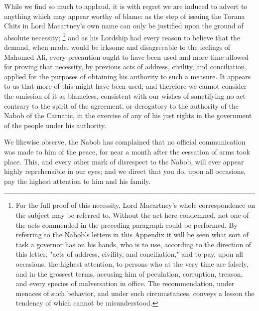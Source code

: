 While we find so much to applaud, it is with regret we are induced to advert to anything which may appear worthy of blame: as the step of issuing the Torana Chits in Lord Macartney's own name can only be justified upon the ground of absolute necessity;
\footnote{ For the full proof of this necessity, Lord Macartney's whole correspondence on the subject may be referred to. Without the act here condemned, not one of the acts commended in the preceding paragraph could be performed. By referring to the Nabob's letters in this Appendix it will be seen what sort of task a governor has on his hands, who is to use, according to the direction of this letter, "acts of address, civility, and conciliation," and to pay, upon all occasions, the highest attention, to persons who at the very time are falsely, and in the grossest terms, accusing him of peculation, corruption, treason, and every species of malversation in office. The recommendation, under menaces of such behavior, and under such circumstances, conveys a lesson the tendency of which cannot be misunderstood.}
 and as his Lordship had every reason to believe that the demand, when made, would be irksome and disagreeable to the feelings of Mahomed Ali, every precaution ought to have been used and more time allowed for proving that necessity, by previous acts of address, civility, and conciliation, applied for the purposes of obtaining his authority to such a measure. It appears to us that more of this might have been used; and therefore we cannot consider the omission of it as blameless, consistent with our wishes of sanctifying no act contrary to the spirit of the agreement, or derogatory to the authority of the Nabob of the Carnatic, in the exercise of any of his just rights in the government of the people under his authority.

We likewise observe, the Nabob has complained that no official communication was made to him of the peace, for near a month after the cessation of arms took place. This, and every other mark of disrespect to the Nabob, will ever appear highly reprehensible in our eyes; and we direct that you do, upon all occasions, pay the highest attention to him and his family.


